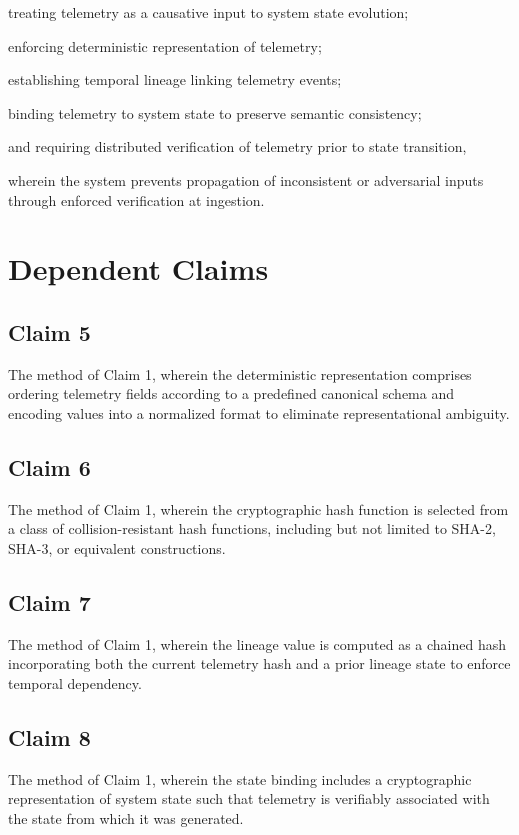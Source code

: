 treating telemetry as a causative input to system state evolution;

enforcing deterministic representation of telemetry;

establishing temporal lineage linking telemetry events;

binding telemetry to system state to preserve semantic consistency;

and requiring distributed verification of telemetry prior to state transition,

wherein the system prevents propagation of inconsistent or adversarial inputs through enforced verification at ingestion.

\section{Dependent Claims}

\subsection{Claim 5}

The method of Claim 1, wherein the deterministic representation comprises ordering telemetry fields according to a predefined canonical schema and encoding values into a normalized format to eliminate representational ambiguity.

\subsection{Claim 6}

The method of Claim 1, wherein the cryptographic hash function is selected from a class of collision-resistant hash functions, including but not limited to SHA-2, SHA-3, or equivalent constructions.

\subsection{Claim 7}

The method of Claim 1, wherein the lineage value is computed as a chained hash incorporating both the current telemetry hash and a prior lineage state to enforce temporal dependency.

\subsection{Claim 8}

The method of Claim 1, wherein the state binding includes a cryptographic representation of system state such that telemetry is verifiably associated with the state from which it was generated.

